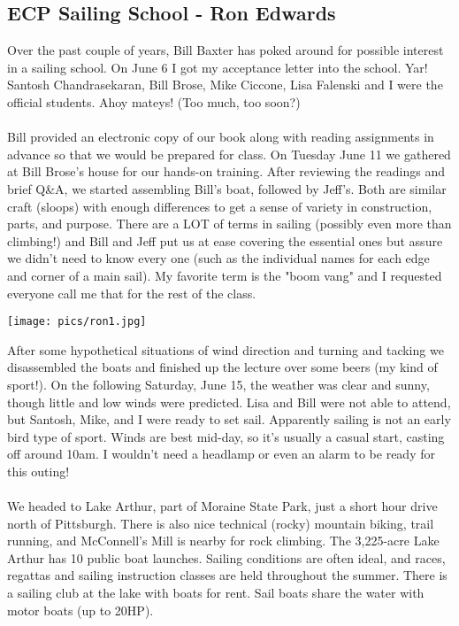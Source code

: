 \documentclass[10pt,a4paper]{article}
\newcommand\subsect[1]{%
  \subsection*{#1}%
  \addcontentsline{toc}{subsection}{#1}}
\newenvironment{Figure}
  {\par\medskip\noindent\minipage{\linewidth}}
  {\endminipage\par\medskip}
\begin{document}
\begin{multicols}{2}
\subsect{ECP Sailing School - Ron Edwards}
Over the past couple of years, Bill Baxter has poked around for possible interest in a sailing school.  
On June 6 I got my acceptance letter into the school.  Yar! Santosh Chandrasekaran, Bill Brose, Mike Ciccone, Lisa Falenski and I were the official students.  Ahoy mateys!  (Too much, too soon?)
\\
\\
Bill provided an electronic copy of our book along with reading assignments in advance so that we would be prepared for class.  On Tuesday June 11 we gathered at Bill Brose's house for our hands-on training.  After reviewing the readings and brief Q\&A, we started assembling Bill's boat, followed by Jeff's.  Both are similar craft (sloops) with enough differences to get a sense of variety in construction, parts, and purpose.  There are a LOT of terms in sailing (possibly even more than climbing!) and Bill and Jeff put us at ease covering the essential ones but assure we didn't need to know every one (such as the individual names for each edge and corner of a main sail).  My favorite term is the "boom vang" and I requested everyone call me that for the rest of the class.
\begin{Figure}
 \centering
 \texttt{[image: pics/ron1.jpg]}
\end{Figure}
After some hypothetical situations of wind direction and turning and tacking we disassembled the boats and finished up the lecture over some beers (my kind of sport!). On the following Saturday, June 15, the weather was clear and sunny, though little and low winds were predicted.  Lisa and Bill were not able to attend, but Santosh, Mike, and I were ready to set sail.  Apparently sailing is not an early bird type of sport.  Winds are best mid-day, so it's usually a casual start, casting off around 10am.  I wouldn't need a headlamp or even an alarm to be ready for this outing!
\\
\\
We headed to Lake Arthur, part of Moraine State Park, just a short hour drive north of Pittsburgh. There is also nice technical (rocky) mountain biking, trail running, and McConnell's Mill is nearby for rock climbing.  The 3,225-acre Lake Arthur has 10 public boat launches. Sailing conditions are often ideal, and races, regattas and sailing instruction classes are held throughout the summer.  There is a sailing club at the lake with boats for rent.  Sail boats share the water with motor boats (up to 20HP).

\end{multicols}
\end{document}

